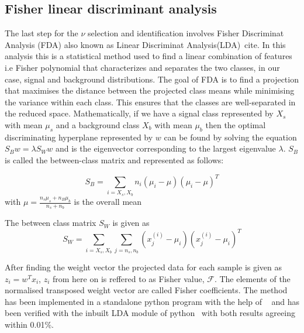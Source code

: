 \subsection{Fisher linear discriminant analysis}
\label{subsec:nu_sel_fisher}
The last step for the $\nu$ selection and identification involves Fisher Discriminat Analysis (FDA) also known as Linear Discriminat Analysis(LDA)~cite{}. In this analysis this is a statistical method used to find a linear combination of features i.e Fisher polynomial that characterizes and separates the two classes, in our case, signal and background distributions. The goal of FDA is to find a projection that maximises the distance between the projected class means while minimising the variance within each class. This ensures that the classes are well-separated in the reduced space. Mathematically, if we have a signal class represented by $X_s$ with mean $\mu_s$ and a background class $X_b$ with mean $\mu_b$ then the optimal discriminating hyperplane represented by $w$ can be found by solving the equation $S_B w = \lambda S_W w$ and is the eigenvector corresponding to the largest eigenvalue $\lambda$. $S_B$ is called the between-class matrix and represented as follows:

\begin{equation}
  S_B = \sum_{i = X_s,X_b} n_i (\mu_i - \mu)(\mu_i - \mu)^T
\end{equation}
with $\mu = \frac{n_s \mu_s + n_B \mu_b}{n_s + n_b}$ is the overall mean 

The between class matrix $S_W$ is given as
\begin{equation}
  S_W = \sum_{i = X_s,X_b} \sum_{j = n_s,n_b } (x^{(i)}_j - \mu_i) (x^{(i)}_j - \mu_i)^T
\end{equation}

After finding the weight vector the projected data for each sample is given as $z_i = w^Tx_i$, $z_i$ from here on is reffered to as Fisher value, $\mathcal{F}$. The elements of the normalised transposed weight vector are called Fisher coefficients. The method has been implemented in a standalone python program with the help of ~\cite{} and has been verified with the inbuilt LDA module of python~\cite{} with both results agreeing within 0.01\%. 

